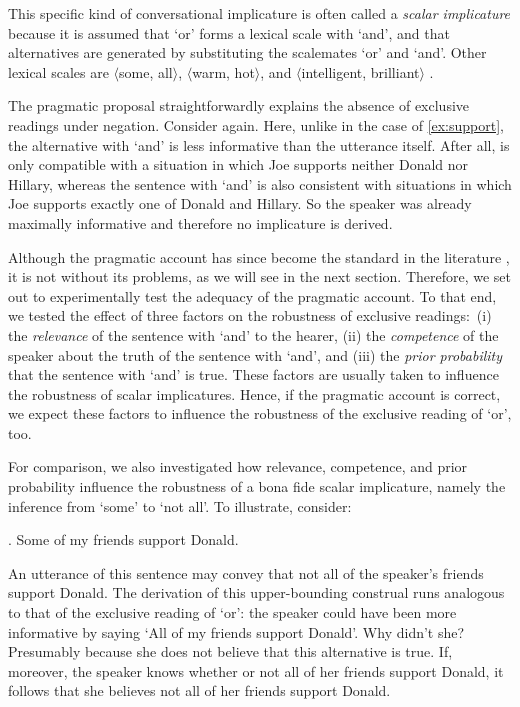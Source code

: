 \documentclass[12pt]{article}
\begin{document}
This specific kind of conversational implicature is often called a \emph{scalar implicature} because it is assumed that `or' forms a lexical scale with `and', and that alternatives are generated by substituting the scalemates `or' and `and'. Other lexical scales are $\langle$some, all$\rangle$, $\langle$warm, hot$\rangle$, and $\langle$intelligent, brilliant$\rangle$ \citep[cf. e.g.,][]{tiel2016}.

The pragmatic proposal straightforwardly explains the absence of exclusive readings under negation. Consider \LLast again. Here, unlike in the case of \ref{ex:support}, the alternative with `and' is less informative than the utterance itself. After all, \LLast is only compatible with a situation in which Joe supports neither Donald nor Hillary, whereas the sentence with `and' is also consistent with situations in which Joe supports exactly one of Donald and Hillary. So the speaker was already maximally informative and therefore no implicature is derived.

Although the pragmatic account has since become the standard in the literature \citep[e.g.,][]{chevallier2008, gazdar1979, sauerland2004, geurts2010}, it is not without its problems, as we will see in the next section. Therefore, we set out to experimentally test the adequacy of the pragmatic account. To that end, we tested the effect of three factors on the robustness of exclusive readings:\ (i) the \emph{relevance} of the sentence with `and' to the hearer, (ii) the \emph{competence} of the speaker about the truth of the sentence with `and', and (iii) the \emph{prior probability} that the sentence with `and' is true. These factors are usually taken to influence the robustness of scalar implicatures. Hence, if the pragmatic account is correct, we expect these factors to influence the robustness of the exclusive reading of `or', too. 

For comparison, we also investigated how relevance, competence, and prior probability influence the robustness of a bona fide scalar implicature, namely the inference from `some' to `not all'. To illustrate, consider:

\ex.	Some of my friends support Donald.

An utterance of this sentence may convey that not all of the speaker's friends support Donald. The derivation of this upper-bounding construal runs analogous to that of the exclusive reading of `or': the speaker could have been more informative by saying `All of my friends support Donald'. Why didn't she? Presumably because she does not believe that this alternative is true. If, moreover, the speaker knows whether or not all of her friends support Donald, it follows that she believes not all of her friends support Donald.
\end{document}
